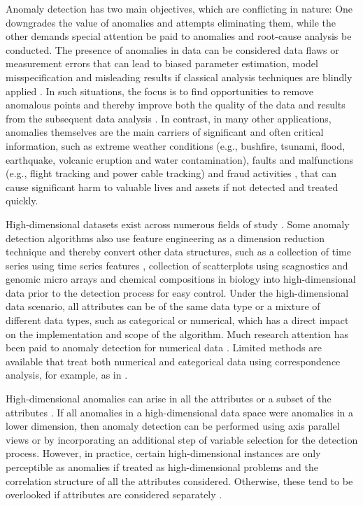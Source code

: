 \documentclass[11pt,a4paper,]{article}
\theoremstyle{definition}
\theoremstyle{definition}
\theoremstyle{definition}
\theoremstyle{remark}
\begin{document}
Anomaly detection has two main objectives, which are conflicting in nature: One downgrades the value of anomalies and attempts eliminating them, while the other demands special attention be paid to anomalies and root-cause analysis be conducted. The presence of anomalies in data can be considered data flaws or measurement errors that can lead to biased parameter estimation, model misspecification and misleading results if classical analysis techniques are blindly applied \autocite{ben2005outlier,abuzaid2013detection}. In such situations, the focus is to find opportunities to remove anomalous points and thereby improve both the quality of the data and results from the subsequent data analysis \autocite{novotny2006outlier}. In contrast, in many other applications, anomalies themselves are the main carriers of significant and often critical information, such as extreme weather conditions (e.g., bushfire, tsunami, flood, earthquake, volcanic eruption and water contamination), faults and malfunctions (e.g., flight tracking and power cable tracking) and fraud activities \autocite{ben2005outlier}, that can cause significant harm to valuable lives and assets if not detected and treated quickly.

High-dimensional datasets exist across numerous fields of study \autocite{liu2016visualizing}. Some anomaly detection algorithms also use feature engineering as a dimension reduction technique and thereby convert other data structures, such as a collection of time series using time series features \autocite{talagala2019feature,hyndman2015large}, collection of scatterplots using scagnostics \autocite{wilkinson2005graph} and genomic micro arrays and chemical compositions in biology \autocite{liu2016visualizing} into high-dimensional data prior to the detection process for easy control. Under the high-dimensional data scenario, all attributes can be of the same data type or a mixture of different data types, such as categorical or numerical, which has a direct impact on the implementation and scope of the algorithm. Much research attention has been paid to anomaly detection for numerical data \autocite{breunig2000lof,tang2002enhancing,jin2006ranking,gao2011rkof}. Limited methods are available that treat both numerical and categorical data using correspondence analysis, for example, as in \textcite{wilkinson2017visualizing}.

High-dimensional anomalies can arise in all the attributes or a subset of the attributes \autocite{unwin2019multivariate}. If all anomalies in a high-dimensional data space were anomalies in a lower dimension, then anomaly detection can be performed using axis parallel views or by incorporating an additional step of variable selection for the detection process. However, in practice, certain high-dimensional instances are only perceptible as anomalies if treated as high-dimensional problems and the correlation structure of all the attributes considered. Otherwise, these tend to be overlooked if attributes are considered separately \autocite{wilkinson2017visualizing,ben2005outlier}.
\end{document}
